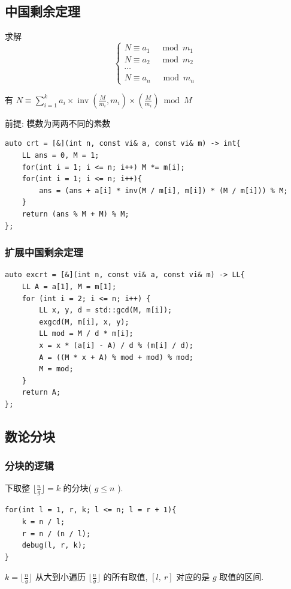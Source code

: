 \documentclass[UTF8, a4paper, titlepage, twoside]{ctexart}
\begin{document}
\subsection{ 中国剩余定理 }
求解
$$
\left\{\begin{array}{ll}N \equiv a_{1} \quad \bmod m_{1} \\ N \equiv a_{2} \quad \bmod m_{2} \\  \cdots \\ N \equiv a_{n} \quad \bmod m_{n}\end{array}\right.
$$

有 $N \equiv \sum\limits_{i=1}^{k} a_{i} \times \operatorname{inv}\left(\frac{M}{m_{i}}, m_{i}\right) \times\left(\frac{M}{m_{i}}\right)\bmod M$

前提: 模数为两两不同的素数

\begin{lstlisting}
auto crt = [&](int n, const vi& a, const vi& m) -> int{
    LL ans = 0, M = 1;
    for(int i = 1; i <= n; i++) M *= m[i];
    for(int i = 1; i <= n; i++){
        ans = (ans + a[i] * inv(M / m[i], m[i]) * (M / m[i])) % M;
    }
    return (ans % M + M) % M;
};
\end{lstlisting}

\subsubsection{ 扩展中国剩余定理 }
\begin{lstlisting}
auto excrt = [&](int n, const vi& a, const vi& m) -> LL{
    LL A = a[1], M = m[1];
    for (int i = 2; i <= n; i++) {
        LL x, y, d = std::gcd(M, m[i]);
        exgcd(M, m[i], x, y);
        LL mod = M / d * m[i];
        x = x * (a[i] - A) / d % (m[i] / d); 
        A = ((M * x + A) % mod + mod) % mod;
        M = mod;
    }
    return A;
};
\end{lstlisting}

\subsection{ 数论分块 }
\subsubsection{ 分块的逻辑 }
下取整 $\lfloor \frac{n}{g} \rfloor = k$ 的分块( $g \leqslant n$ ).
\begin{lstlisting}
for(int l = 1, r, k; l <= n; l = r + 1){
    k = n / l;
    r = n / (n / l);
    debug(l, r, k);
}	
\end{lstlisting}
$k = \lfloor \frac{n}{g} \rfloor$ 从大到小遍历 $\lfloor \frac{n}{g} \rfloor$ 的所有取值, $[l, \ r]$ 对应的是 $g$ 取值的区间. 
\end{document}

